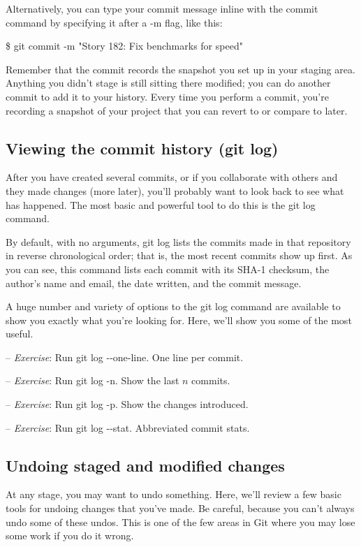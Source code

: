 \documentclass[12pt,a4]{article}
\newcommand{\ilcode}[1]{\textcolor[RGB]{160, 110, 220}{#1}}
\begin{document}
Alternatively, you can type your commit message inline with the commit command
by specifying it after a -m flag, like this:

\hspace*{1cm}
\ilcode{\$ git commit -m "Story 182: Fix benchmarks for speed"}

Remember that the commit records the snapshot you set up in your staging area.
Anything you didn’t stage is still sitting there modified; you can do another
commit to add it to your history. Every time you perform a commit, you’re
recording a snapshot of your project that you can revert to or compare to later.

\subsection{Viewing the commit history (git log)}
After you have created several commits, or if you collaborate with others and
they made changes (more later), you’ll probably want to look back to see what
has happened. The most basic and powerful tool to do this is the \ilcode{git
log} command.

By default, with no arguments, \ilcode{git log} lists the commits made in that
repository in reverse chronological order; that is, the most recent commits show
up first. As you can see, this command lists each commit with its SHA-1
checksum, the author’s name and email, the date written, and the commit message.

A huge number and variety of options to the git log command are available to
show you exactly what you’re looking for. Here, we’ll show you some of the most
useful.

{\sf -- \emph{Exercise}:} Run \ilcode{git log -{}-one-line}. One line per commit.

{\sf -- \emph{Exercise}:} Run \ilcode{git log -n}. Show the last $n$ commits.

{\sf -- \emph{Exercise}:} Run \ilcode{git log -p}. Show the changes introduced.

{\sf -- \emph{Exercise}:} Run \ilcode{git log -{}-stat}. Abbreviated commit stats.

\subsection{Undoing staged and modified changes}
At any stage, you may want to undo something. Here, we’ll review a few basic
tools for undoing changes that you’ve made. Be careful, because you can’t always
undo some of these undos. This is one of the few areas in Git where you may lose
some work if you do it wrong.
\end{document}

